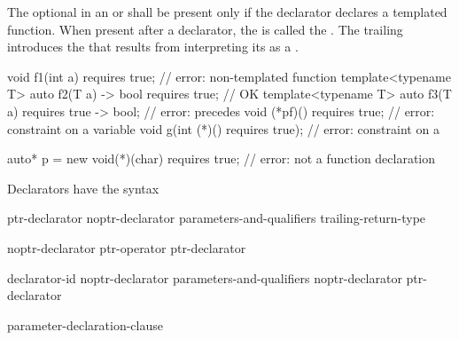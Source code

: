 \pnum
The optional  in an
 or 
shall be present only if the declarator declares a
templated function.
%
%
When present after a declarator, the 
is called the .
The trailing  introduces the
 that results from interpreting
its  as a
.
%
\begin{example}
\begin{codeblock}
void f1(int a) requires true;               // error: non-templated function
template<typename T>
  auto f2(T a) -> bool requires true;       // OK
template<typename T>
  auto f3(T a) requires true -> bool;       // error:  precedes 
void (*pf)() requires true;                 // error: constraint on a variable
void g(int (*)() requires true);            // error: constraint on a 

auto* p = new void(*)(char) requires true;  // error: not a function declaration
\end{codeblock}
\end{example}

\pnum
Declarators have the syntax
\begin{bnf}
\br
    ptr-declarator\br
    noptr-declarator parameters-and-qualifiers trailing-return-type
\end{bnf}

\begin{bnf}
\br
    noptr-declarator\br
    ptr-operator ptr-declarator
\end{bnf}

\begin{bnf}
\br
    declarator-id \br
    noptr-declarator parameters-and-qualifiers\br
    noptr-declarator \terminal{[}  \terminal{]} \br
    \terminal{(} ptr-declarator \terminal{)}
\end{bnf}

\begin{bnf}
\br
    \terminal{(} parameter-declaration-clause \terminal{)} \br
    \bnfindent{}  
\end{bnf}

